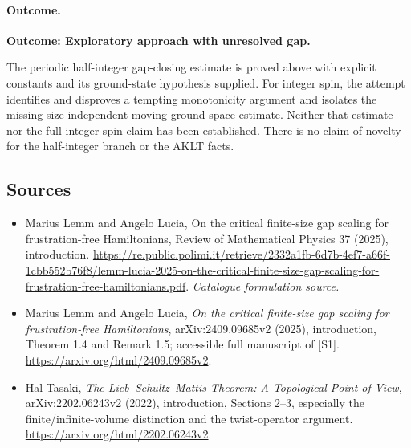 \documentclass[11pt,a4paper]{article}
\numberwithin{equation}{section}
\begin{document}
\paragraph{Outcome.}
\textbf{Outcome: Exploratory approach with unresolved gap.}

The periodic half-integer gap-closing estimate is proved above with explicit
constants and its ground-state hypothesis supplied. For integer spin, the
attempt identifies and disproves a tempting monotonicity argument and
isolates the missing size-independent moving-ground-space estimate.
Neither that estimate nor the full integer-spin claim has been established.
There is no claim of novelty for the half-integer branch or the AKLT facts.
\subsection{Sources}
\begin{itemize}\raggedright
\item[\textnormal{[S1]}]\hypertarget{source:30006733:1}{} Marius Lemm and Angelo Lucia, On the critical finite-size gap scaling for frustration-free Hamiltonians, Review of Mathematical Physics 37 (2025), introduction.
\url{https://re.public.polimi.it/retrieve/2332a1fb-6d7b-4ef7-a66f-1cbb552b76f8/lemm-lucia-2025-on-the-critical-finite-size-gap-scaling-for-frustration-free-hamiltonians.pdf}.
{\small\textit{Catalogue formulation source.}}
\item[\textnormal{[E1]}]\hypertarget{extra:30006733:1}{} Marius Lemm and Angelo Lucia,
\emph{On the critical finite-size gap scaling for frustration-free Hamiltonians},
arXiv:2409.09685v2 (2025), introduction, Theorem 1.4 and Remark 1.5;
accessible full manuscript of [S1].
\url{https://arxiv.org/html/2409.09685v2}.
\item[\textnormal{[E2]}]\hypertarget{extra:30006733:2}{} Hal Tasaki,
\emph{The Lieb--Schultz--Mattis Theorem: A Topological Point of View},
arXiv:2202.06243v2 (2022), introduction, Sections 2--3, especially the
finite/infinite-volume distinction and the twist-operator argument.
\url{https://arxiv.org/html/2202.06243v2}.
\end{itemize}
\end{document}
